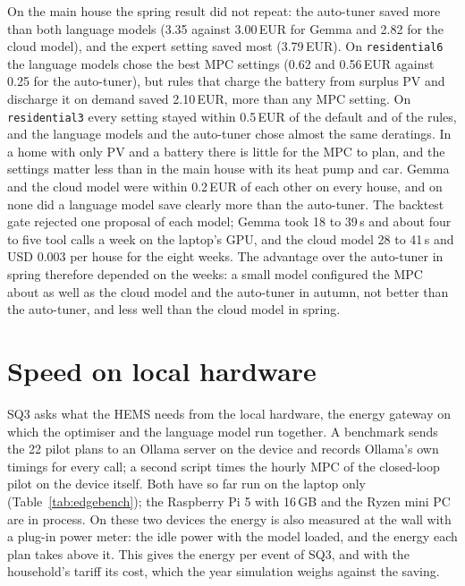 On the main house the spring result did not repeat: the auto-tuner
saved more than both language models (3.35 against 3.00\,EUR for Gemma
and 2.82 for the cloud model), and the expert setting saved most
(3.79\,EUR). On \texttt{residential6} the language models chose the
best MPC settings (0.62 and 0.56\,EUR against 0.25 for the auto-tuner),
but rules that charge the battery from surplus PV and discharge it on
demand saved 2.10\,EUR, more than any MPC setting. On
\texttt{residential3} every setting stayed within 0.5\,EUR of the
default and of the rules, and the language models and the auto-tuner
chose almost the same deratings. In a home with only PV and a battery
there is little for the MPC to plan, and the settings matter less than
in the main house with its heat pump and car. Gemma and the cloud model
were within 0.2\,EUR of each other on every house, and on none did a
language model save clearly more than the auto-tuner. The backtest gate
rejected one proposal of each model; Gemma took 18 to 39\,s and about
four to five tool calls a week on the laptop's GPU, and the cloud model
28 to 41\,s and USD 0.003 per house for the eight weeks. The advantage
over the auto-tuner in spring therefore depended on the weeks: a small
model configured the MPC about as well as the cloud model and the
auto-tuner in autumn, not better than the auto-tuner, and less well
than the cloud model in spring.

\section{Speed on local hardware}
\label{sec:edgebench}

SQ3 asks what the HEMS needs from the local hardware, the energy
gateway on which the optimiser and the language model run together. A
benchmark sends the 22 pilot plans to an Ollama server on the device
and records Ollama's own timings for every call; a second script times
the hourly MPC of the closed-loop pilot on the device itself. Both have
so far run on the laptop only (Table~\ref{tab:edgebench}); the Raspberry
Pi 5 with 16\,GB and the Ryzen mini PC are in process. On these two
devices the energy is also measured at the wall with a plug-in power
meter: the idle power with the model loaded, and the energy each plan
takes above it. This gives the energy per event of SQ3, and with the
household's tariff its cost, which the year simulation weighs against
the saving.

